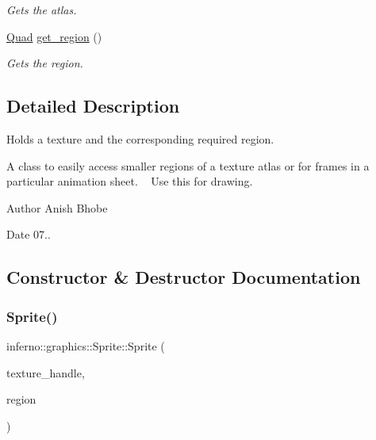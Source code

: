 \begin{DoxyCompactItemize}
\begin{DoxyCompactList}\small\item\em Gets the atlas. \end{DoxyCompactList}\item 
\mbox{\hyperlink{classinferno_1_1graphics_1_1_quad}{Quad}} \mbox{\hyperlink{classinferno_1_1graphics_1_1_sprite_a96641ce00e18f5f70a0b4972f1b50180}{get\+\_\+region}} ()
\begin{DoxyCompactList}\small\item\em Gets the region. \end{DoxyCompactList}\end{DoxyCompactItemize}


\subsection{Detailed Description}
Holds a texture and the corresponding required region. 

A class to easily access smaller regions of a texture atlas or for frames in a particular animation sheet. ~\newline
Use this for drawing. \begin{DoxyAuthor}{Author}
Anish Bhobe 
\end{DoxyAuthor}
\begin{DoxyDate}{Date}
07.. 
\end{DoxyDate}


\subsection{Constructor \& Destructor Documentation}
\mbox{\label{classinferno_1_1graphics_1_1_sprite_a404b45a087a04018e5e2bc5c7b59ab67}} 
\subsubsection{\texorpdfstring{Sprite()}{Sprite()}\hspace{0.1cm}{\footnotesize\ttfamily [1/2]}}
{\footnotesize\ttfamily inferno\+::graphics\+::\+Sprite\+::\+Sprite (\begin{DoxyParamCaption}\item[{\mbox{\hyperlink{namespaceinferno_1_1graphics_a9d719bfbfedd17b9ace9b8d603ab5a38}{Texture\+Handle}}}]{texture\+\_\+handle,  }\item[{\mbox{\hyperlink{classinferno_1_1graphics_1_1_quad}{Quad}}}]{region }\end{DoxyParamCaption})\hspace{0.3cm}{\ttfamily [inline]}}



